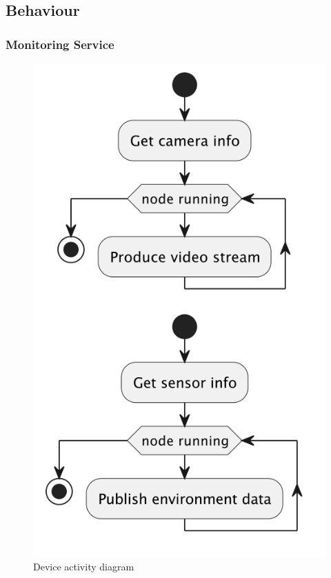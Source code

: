 \documentclass{scrartcl}
\begin{document}
    \subsection{Behaviour}

    \subsubsection{Monitoring Service}
    \begin{figure}
        \centering
        \includegraphics[scale=0.6]{img/device-activity}
        \caption{Device activity diagram}
        \label{fig:device-activity}
    \end{figure}
\end{document}
